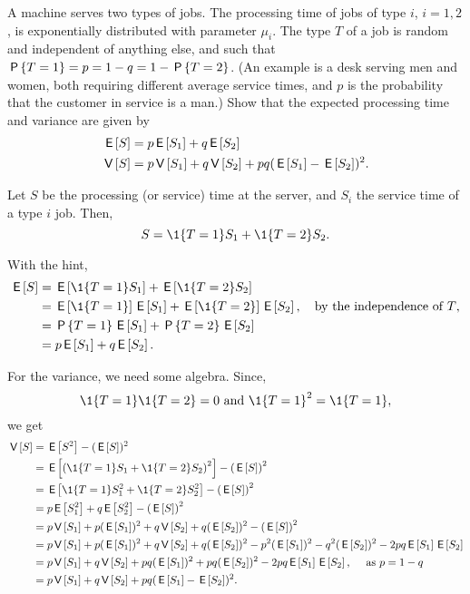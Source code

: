 \begin{exercise}\label{ex:49}
  A machine serves two types of jobs.
  The processing time of jobs of type $i$, $i=1,2$, is exponentially distributed with parameter $\mu_i$.
  The type $T$ of a job is random and independent of anything else, and such that $\P{T=1} = p = 1-q = 1-\P{T=2}$.
  (An example is a desk serving men and women, both requiring different average service times, and $p$ is the probability that the customer in service is a man.)
  Show that the expected processing time and variance are given by
\begin{align*}
 \E S &= p \E{S_1} + q \E{S_2} \\
\V S &= p \V{S_1} + q \V{S_2} + pq(\E{S_1} - \E{S_2})^2.
 \end{align*}


\begin{hint}
 Let $S$ be the processing (or service) time at the server, and
 $S_i$ the service time of a type $i$ job. Then,
 \begin{equation*}
 S = \1{T=1} S_1 + \1{T=2} S_2.
 \end{equation*}
\end{hint}
\begin{solution}
With the hint,
\begin{align*}
 \E S
&= \E{\1{T=1} S_1} + \E{\1{T=2} S_2} \\
&= \E{\1{T=1}} \E{S_1} + \E{\1{T=2}} \E{S_2}, \quad \text{by the independence of $T$}, \\
&= \P{T=1}\E{S_1} + \P{T=2} \E{S_2} \\
&= p \E{S_1} + q \E{S_2}.
\end{align*}

For the variance, we need some algebra. Since,
\begin{equation*}
\1{T=1}\1{T=2} = 0 \text{ and } \1{T=1}^2 = \1{T=1},
\end{equation*}
we get
\begin{align*}
 \V S
&= \E{S^2} - (\E S)^2 \\
&= \E{\left(\1{T=1} S_1 + \1{T=2} S_2\right)^2} - \left(\E{S}\right)^2 \\
&= \E{\1{T=1} S_1^2 + \1{T=2} S_2^2} - \left(\E S \right)^2 \\
&= p \E{S_1^2} + q \E{S_2^2} - \left(\E S \right)^2 \\
&= p \V{S_1} + p (\E{S_1})^2 + q \V{S_2} + q(\E{S_2})^2 - \left(\E S\right)^2 \\
&= p \V{S_1} + p (\E{S_1})^2 + q \V{S_2} + q(\E{S_2})^2 - p^2 (\E{S_1})^2 - q^2 (\E{S_2})^2 - 2pq \E{S_1}\E{S_2} \\
&= p \V{S_1} + q \V{S_2} + pq (\E{S_1})^2 +pq (\E{S_2})^2 - 2pq \E{S_1}\E{S_2}, \quad\text{ as } p = 1-q\\
&= p \V{S_1} + q \V{S_2} + pq(\E{S_1} - \E{S_2})^2.
\end{align*}
\end{solution}
\end{exercise}




